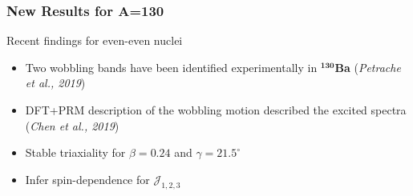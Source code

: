\documentclass{beamer}
\begin{document}
\begin{frame}
  \frametitle{New Results for A=130}
  \begin{minipage}{.8\textwidth}
    \begin{block}{Recent findings for even-even nuclei}
      \begin{itemize}
        \item Two wobbling bands have been identified experimentally in \textbf{$^\mathbf{130}$Ba} (\textit{Petrache et al., 2019})
        \item DFT+PRM description of the wobbling motion described the excited spectra (\textit{Chen et al., 2019})
        \item Stable triaxiality for $\beta=0.24$ and $\gamma=21.5^\circ$
        \item Infer spin-dependence for $\mathcal{J}_{1,2,3}$
      \end{itemize}
    \end{block}
  \end{minipage}%
  \begin{minipage}{.2\textwidth}
    \begin{figure}
      \centering

\end{figure}
\end{minipage}
\end{frame}
\end{document}
